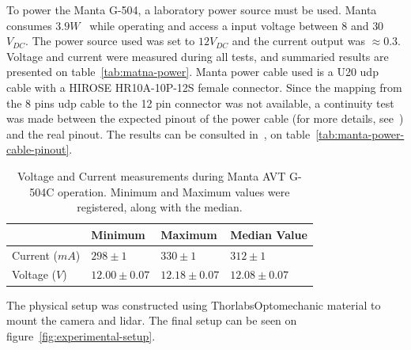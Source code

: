To power the Manta G-504, a laboratory power source must be used. Manta consumes $3.9 W$~\cite{MantaG504C} while operating and access a input voltage between $8$ and $30$ $V_{DC}$. The power source used was set to  $12 V_{DC}$ and the current output was $\approx 0.3$. Voltage and current were measured during all tests, and summaried results are presented on table~\ref{tab:matna-power}. Manta power cable used is a U20 \ac{udp} cable with a HIROSE HR10A-10P-12S female connector. Since the mapping from the 8 pins \ac{udp} cable to the 12 pin connector was not available, a continuity test was made between the expected pinout of the power cable (for more details, see~\cite{AVTCables}) and the real pinout. The results can be consulted in~, on table~\ref{tab:manta-power-cable-pinout}.

	
\begin{table}[H]
	\centering
	\renewcommand{\arraystretch}{1.2}
	\renewcommand{\tabcolsep}{0.45cm}
	\begin{tabular}{@{}llll@{}}
		\toprule
					  & Minimum & Maximum & Median Value \\ \midrule
		Current ($mA$) & $298 \pm 1$ & $330\pm 1$ & $312 \pm 1$ \\
		Voltage ($V$)  & $12.00\pm 0.07 $ & $12.18\pm 0.07$ & $12.08\pm0.07$ \\
		\bottomrule
	\end{tabular}
	\centering
	\label{tab:manta-power}
	\caption{Voltage and Current measurements during Manta AVT G-504C operation. Minimum and Maximum values were registered, along with the median. }
\end{table}

The physical setup was constructed using Thorlabs\cp Optomechanic material to mount the camera and \ac{lidar}. The final setup can be seen on figure~\ref{fig:experimental-setup}.

